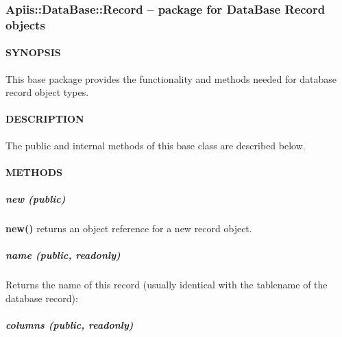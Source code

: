 \subsubsection{Apiis::DataBase::Record -- package for DataBase Record objects\label{Apiis::DataBase::Record_--_package_for_DataBase_Record_objects}}




\paragraph*{SYNOPSIS\label{Apiis::DataBase::Record_--_package_for_DataBase_Record_objects_SYNOPSIS}}


This base package provides the functionality and methods needed for
database record object types.

\paragraph*{DESCRIPTION\label{Apiis::DataBase::Record_--_package_for_DataBase_Record_objects_DESCRIPTION}}


The public and internal methods of this base class are described below.

\paragraph*{METHODS\label{Apiis::DataBase::Record_--_package_for_DataBase_Record_objects_METHODS}}
\subparagraph*{new (public)\label{Apiis::DataBase::Record_--_package_for_DataBase_Record_objects_new_public_}}


\textbf{new()} returns an object reference for a new record object.

\subparagraph*{name (public, readonly)\label{Apiis::DataBase::Record_--_package_for_DataBase_Record_objects_name_public_readonly_}}


Returns the name of this record (usually identical with the tablename of
the database record):

\subparagraph*{columns (public, readonly)\label{Apiis::DataBase::Record_--_package_for_DataBase_Record_objects_columns_public_readonly_}}


